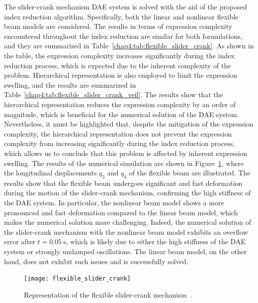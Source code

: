 The slider-crank mechanism \ac{DAE} system is solved with the aid of the proposed index reduction algorithm. Specifically, both the linear and nonlinear flexible beam models are considered. The results in terms of expression complexity encountered throughout the index reduction are similar for both formulations, and they are summarized in Table~\ref{chap4:tab:flexible_slider_crank}. As shown in the table, the expression complexity increases significantly during the index reduction process, which is expected due to the inherent complexity of the problem. Hierarchical representation is also employed to limit the expression swelling, and the results are summarized in Table~\ref{chap4:tab:flexible_slider_crank_veil}. The results show that the hierarchical representation reduces the expression complexity by an order of magnitude, which is beneficial for the numerical solution of the \ac{DAE} system. Nevertheless, it must be highlighted that, despite the mitigation of the expression complexity, the hierarchical representation does not prevent the expression complexity from increasing significantly during the index reduction process, which allows us to conclude that this problem is affected by inherent expression swelling. The results of the numerical simulation are shown in Figure~\ref{chap4:fig:flexible_slider_crank}, where the longitudinal displacements $q_3$ and $q_4$ of the flexible beam are illustrated. The results show that the flexible beam undergoes significant and fast deformation during the motion of the slider-crank mechanism, confirming the high stiffness of the \ac{DAE} system. In particular, the nonlinear beam model shows a more pronounced and fast deformation compared to the linear beam model, which makes the numerical solution more challenging. Indeed, the numerical solution of the slider-crank mechanism with the nonlinear beam model exhibits an overflow error after $t = \SI{0.05}{\second}$, which is likely due to either the high stiffness of the \ac{DAE} system or strongly undamped oscillations. The linear beam model, on the other hand, does not exhibit such issues and is successfully solved.

\begin{figure}[htb]
  \centering
  \texttt{[image: flexible\_slider\_crank]}
  \caption{Representation of the flexible slider-crank mechanism~\cite{lioen1998test, mazzia2008test}.}
  \label{chap4:fig:flexible_slider_crank}
\end{figure}

